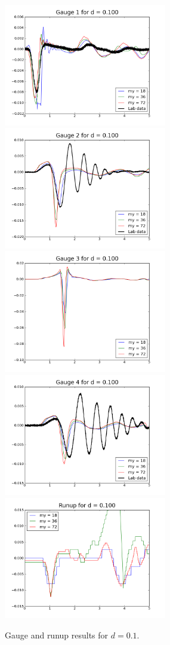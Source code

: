 \begin{figure}[ht]
\hfil\includegraphics[width=2.8in]{bp3/gauge1-d0-1.png}\hfil
\hfil\includegraphics[width=2.8in]{bp3/gauge2-d0-1.png}\hfil
\vskip 10pt
\hfil\includegraphics[width=2.8in]{bp3/gauge3-d0-1.png}\hfil
\hfil\includegraphics[width=2.8in]{bp3/gauge4-d0-1.png}\hfil
\vskip 10pt
\hfil\includegraphics[width=2.8in]{bp3/runup-d0-1.png}\hfil

\caption{\label{fig:bp3gauge3} 
Gauge and runup results for $d=0.1$.
  }
\end{figure}



